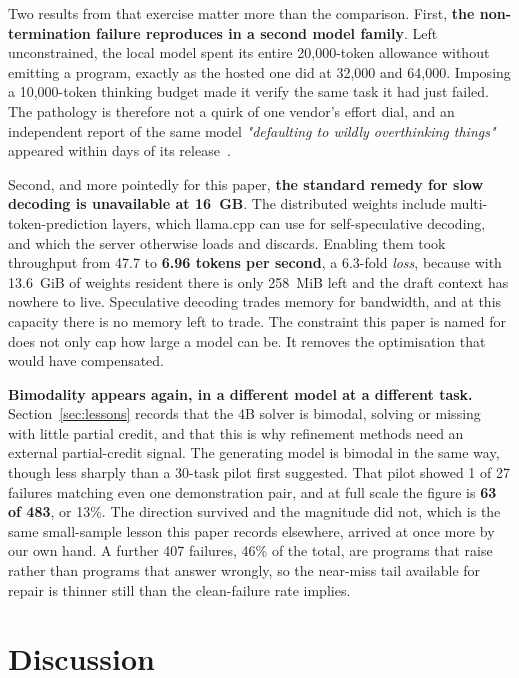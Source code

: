 \documentclass[11pt]{article}
\begin{document}
Two results from that exercise matter more than the comparison. First, \textbf{the
non-termination failure reproduces in a second model family}. Left unconstrained, the local model
spent its entire 20{,}000-token allowance without emitting a program, exactly as the hosted one did
at 32{,}000 and 64{,}000. Imposing a 10{,}000-token thinking budget made it verify the same task it
had just failed. The pathology is therefore not a quirk of one vendor's effort dial, and an
independent report of the same model \emph{"defaulting to wildly overthinking things"} appeared
within days of its release~\cite{willison2026qwen}.

Second, and more pointedly for this paper, \textbf{the standard remedy for slow decoding is
unavailable at 16~GB}. The distributed weights include multi-token-prediction layers, which
llama.cpp can use for self-speculative decoding, and which the server otherwise loads and discards.
Enabling them took throughput from 47.7 to \textbf{6.96 tokens per second}, a 6.3-fold \emph{loss},
because with 13.6~GiB of weights resident there is only 258~MiB left and the draft context has
nowhere to live. Speculative decoding trades memory for bandwidth, and at this capacity there is no
memory left to trade. The constraint this paper is named for does not only cap how large a model can
be. It removes the optimisation that would have compensated.

\textbf{Bimodality appears again, in a different model at a different task.}
Section~\ref{sec:lessons} records that the 4B solver is bimodal, solving or missing with little partial
credit, and that this is why refinement methods need an external partial-credit signal. The generating
model is bimodal in the same way, though less sharply than a 30-task pilot first suggested. That pilot
showed 1 of 27 failures matching even one demonstration pair, and at full scale the figure is \textbf{63 of
483}, or 13\%. The direction survived and the magnitude did not, which is the same small-sample lesson
this paper records elsewhere, arrived at once more by our own hand. A further 407 failures, 46\% of the
total, are programs that raise rather than programs that answer wrongly, so the near-miss tail
available for repair is thinner still than the clean-failure rate implies.

\section{Discussion}
\label{sec:disc}
\end{document}
